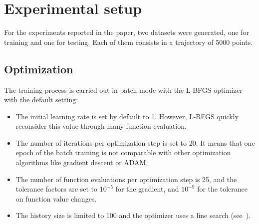 \documentclass{article}
\begin{document}




\clearpage
\appendix

\section{Experimental setup}
\label{sec:setup}
For the experiments reported in the paper, two datasets were generated, one for training and one for testing. Each
of them consists in a trajectory of 5000 points.




\subsection{Optimization}
\label{ssec:optim}

The training process is carried out in batch mode with  the L-BFGS optimizer with  the default setting: 
\begin{itemize}
\item The initial learning rate is set by default to 1. However,
  L-BFGS quickly reconsider this value through many function
  evaluation.
\item The number of iterations per optimization step is set to 20. It
  means that one epoch of the batch training is not comparable with
  other optimization algorithms like gradient descent or ADAM.
\item   The number  of function evaluations per optimization step is 25, and the tolerance factors are set to $10^{-5}$ for the gradient, and  $10^{-9}$ for the tolerance on function value changes. 
\item The history size is limited to 100 and the optimizer uses a line search (see~\cite{Liu89LBFGS}).
\end{itemize}
\end{document}
